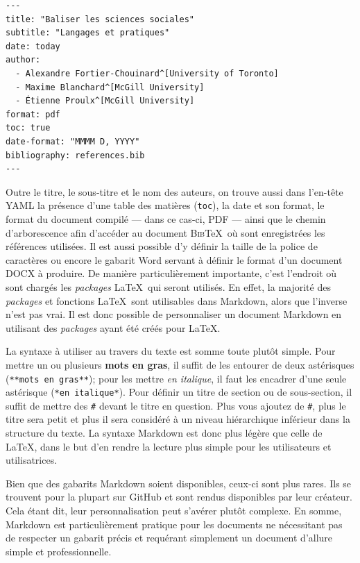 \documentclass[
  letterpaper,
]{scrbook}
\begin{document}
\begin{verbatim}
---
title: "Baliser les sciences sociales"
subtitle: "Langages et pratiques"
date: today
author:
  - Alexandre Fortier-Chouinard^[University of Toronto]
  - Maxime Blanchard^[McGill University]
  - Étienne Proulx^[McGill University]
format: pdf
toc: true
date-format: "MMMM D, YYYY"
bibliography: references.bib
---
\end{verbatim}

Outre le titre, le sous-titre et le nom des auteurs, on trouve aussi
dans l'en-tête YAML la présence d'une table des matières (\texttt{toc}),
la date et son format, le format du document compilé --- dans ce cas-ci,
PDF --- ainsi que le chemin d'arborescence afin d'accéder au document
\textsc{Bib}\TeX~où sont enregistrées les références utilisées. Il est
aussi possible d'y définir la taille de la police de caractères ou
encore le gabarit Word servant à définir le format d'un document DOCX à
produire. De manière particulièrement importante, c'est l'endroit où
sont chargés les \emph{packages} \LaTeX~qui seront utilisés. En effet,
la majorité des \emph{packages} et fonctions \LaTeX~sont utilisables
dans Markdown, alors que l'inverse n'est pas vrai. Il est donc possible
de personnaliser un document Markdown en utilisant des \emph{packages}
ayant été créés pour \LaTeX.

La syntaxe à utiliser au travers du texte est somme toute plutôt simple.
Pour mettre un ou plusieurs \textbf{mots en gras}, il suffit de les
entourer de deux astérisques (\texttt{**mots\ en\ gras**}); pour les
mettre \emph{en italique}, il faut les encadrer d'une seule astérisque
(\texttt{*en\ italique*}). Pour définir un titre de section ou de
sous-section, il suffit de mettre des \texttt{\#} devant le titre en
question. Plus vous ajoutez de \texttt{\#}, plus le titre sera petit et
plus il sera considéré à un niveau hiérarchique inférieur dans la
structure du texte. La syntaxe Markdown est donc plus légère que celle
de \LaTeX, dans le but d'en rendre la lecture plus simple pour les
utilisateurs et utilisatrices.

Bien que des gabarits Markdown soient disponibles, ceux-ci sont plus
rares. Ils se trouvent pour la plupart sur GitHub et sont rendus
disponibles par leur créateur. Cela étant dit, leur personnalisation
peut s'avérer plutôt complexe. En somme, Markdown est particulièrement
pratique pour les documents ne nécessitant pas de respecter un gabarit
précis et requérant simplement un document d'allure simple et
professionnelle.
\end{document}
